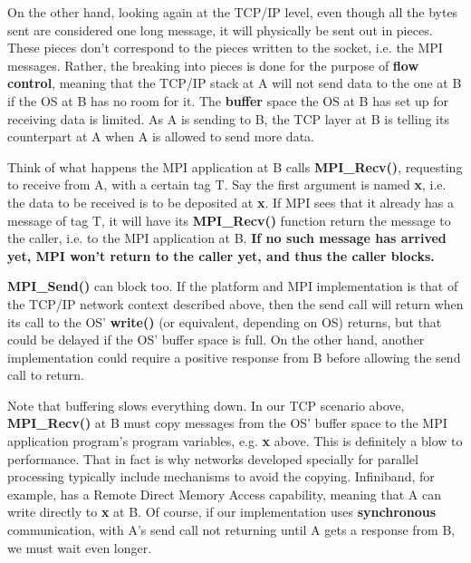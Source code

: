 On the other hand, looking again at the TCP/IP level, even though all
the bytes sent are considered one long message, it will physically be
sent out in pieces.  These pieces don't correspond to the pieces written
to the socket, i.e. the MPI messages.  Rather, the breaking into pieces
is done for the purpose of {\bf flow control}, meaning that the TCP/IP
stack at A will not send data to the one at B if the OS at B has no room
for it.  The {\bf buffer} space the OS at B has set up for receiving
data is limited.  As A is sending to B, the TCP layer at B is telling
its counterpart at A when A is allowed to send more data.  

Think of what happens the MPI application at B calls {\bf MPI\_Recv()},
requesting to receive from A, with a certain tag T.  Say the first
argument is named {\bf x}, i.e.  the data to be received is to be
deposited at {\bf x}.  If MPI sees that it already has a message of tag
T, it will have its {\bf MPI\_Recv()} function return the message to the
caller, i.e. to the MPI application at B.  {\bf If no such message has
arrived yet, MPI won't return to the caller yet, and thus the caller
blocks.}

{\bf MPI\_Send()} can block too.  If the platform and MPI implementation
is that of the TCP/IP network context described above, then the send
call will return when its call to the OS' {\bf write()} (or equivalent,
depending on OS) returns, but that could be delayed if the OS' buffer
space is full.  On the other hand, another implementation could require
a positive response from B before allowing the send call to return.

%  

Note that buffering slows everything down.  In our TCP scenario above,
{\bf MPI\_Recv()} at B must copy messages from the OS' buffer space to
the MPI application program's program variables, e.g.  {\bf x} above.
This is definitely a blow to performance.  That in fact is why networks
developed specially for parallel processing typically include mechanisms
to avoid the copying.  Infiniband, for example, has a Remote Direct
Memory Access capability, meaning that A can write directly to {\bf x}
at B.  Of course, if our implementation uses {\bf synchronous}
communication, with A's send call not returning until A gets a response
from B, we must wait even longer.

